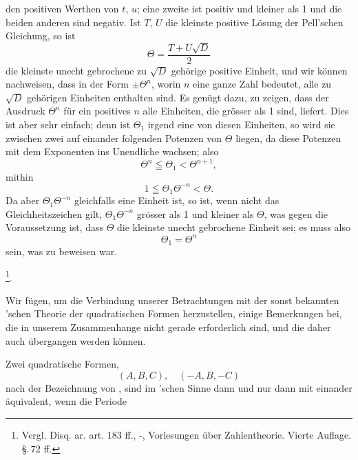 den positiven Werthen von $t$, $u$; eine zweite ist positiv und
kleiner als 1 und die beiden anderen sind negativ. Ist $T$, $U$
die kleinste positive Lösung der Pell'schen Gleichung, so ist
\[
\Theta = \frac{T + U\sqrt{D}}{2}
\]
die kleinste unecht gebrochene zu $\sqrt{D}$ gehörige positive Einheit,
und wir können nachweisen, dass in der Form $\pm \Theta^n$, worin $n$
eine ganze Zahl bedeutet, alle zu $\sqrt{D}$ gehörigen Einheiten enthalten
sind. Es genügt dazu, zu zeigen, dass der Ausdruck $\Theta^n$
für ein positives $n$ alle Einheiten, die grösser als 1 sind, liefert.
Dies ist aber sehr einfach; denn ist $\Theta_1$ irgend eine von diesen
Einheiten, so wird sie zwischen zwei auf einander folgenden
Potenzen von $\Theta$ liegen, da diese Potenzen mit dem Exponenten
ins Unendliche wachsen; also
\[
\Theta^n \leqq \Theta_1 < \Theta^{n+1},
\]
mithin
\[
1 \leqq \Theta_1 \Theta^{-n} < \Theta.
\]
Da aber $\Theta_1 \Theta^{-n}$ gleichfalls eine Einheit ist, so ist, wenn nicht
das Gleichheitszeichen gilt, $\Theta_1 \Theta^{-n}$ grösser als 1 und kleiner als
$\Theta$, was gegen die Voraussetzung ist, dass $\Theta$ die kleinste unecht
gebrochene Einheit sei; es muss also
\[
\Theta_1 = \Theta^n
\]
sein, was zu beweisen war.

\footnote{Vergl. Disq. ar. art. 183 ff., -, Vorlesungen
über Zahlentheorie. Vierte Auflage. \S.\,72 ff.}.

Wir fügen, um die Verbindung unserer Betrachtungen mit
der sonst bekannten 'schen Theorie der quadratischen
Formen herzustellen, einige Bemerkungen bei, die in unserem
Zusammenhange nicht gerade erforderlich sind, und die daher
auch übergangen werden können.

Zwei quadratische Formen,
\[
(A, B, C), \quad (-A, B, -C)
\]
nach der Bezeichnung von , sind im 'schen Sinne
dann und nur dann mit einander äquivalent, wenn die Periode
